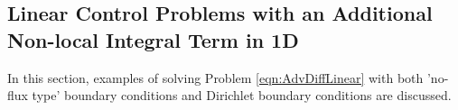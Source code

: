 %
%
%
%


\subsection{Linear Control Problems with an Additional Non-local Integral Term in 1D}
In this section, examples of solving Problem \eqref{eqn:AdvDiffLinear} with both 'no-flux type' boundary conditions and Dirichlet boundary conditions are discussed.
